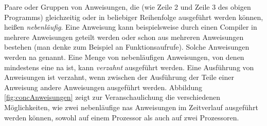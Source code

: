 Paare oder Gruppen von Anweisungen, die (wie Zeile 2 und Zeile 3 des obigen Programms) gleichzeitig oder in beliebiger Reihenfolge ausgeführt werden können, heißen \emph{nebenläufig}. Eine Anweisung kann beispielsweise durch einen Compiler in mehrere Anweisungen geteilt werden oder schon aus mehreren Anweisungen bestehen (man denke zum Beispiel an Funktionsaufrufe). Solche Anweisungen werden \gls{na} genannt. Eine Menge von nebenläufigen Anweisungen, von denen mindestens eine \gls{na} ist, kann \emph{verzahnt} ausgeführt werden. Eine Ausführung von Anweisungen ist verzahnt, wenn zwischen der Ausführung der Teile einer  Anweisung andere Anweisungen ausgeführt werden. Abbildung \ref{fig:concAnweisungen} zeigt zur Veranschaulichung die verschiedenen Möglichkeiten, wie zwei nebenläufige \glspl{na} Anweisungen im Zeitverlauf ausgeführt werden können, sowohl auf einem Prozessor als auch auf zwei Prozessoren. 

